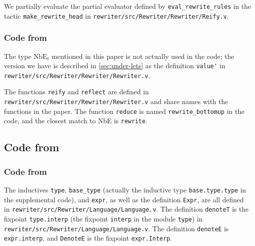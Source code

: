 \begin{subappendices}
We partially evaluate the partial evaluator defined by \verb|eval_rewrite_rules| in the tactic \verb|make_rewrite_head| in \texttt{rewriter/src/Rewriter/Rewriter/Reify.v}.

\subsubsection{Code from }

The type $\text{NbE}_t$ mentioned in this paper is not actually used in the code; the version we have is described in \autoref{sec:under-lets} as the definition \verb|value'| in \texttt{rewriter/src/Rewriter/Rewriter/Rewriter.v}.

The functions \verb|reify| and \verb|reflect| are defined in \texttt{rewriter/src/Rewriter/Rewriter/Rewriter.v} and share names with the functions in the paper.
The function \texttt{reduce} is named \verb|rewrite_bottomup| in the code, and the closest match to NbE is \verb|rewrite|.

\subsection{Code from }

\subsubsection{Code from }

The inductives \verb|type|, \verb|base_type| (actually the inductive type \verb|base.type.type| in the supplemental code), and \verb|expr|, as well as the definition \verb|Expr|, are all defined in \texttt{rewriter/src/Rewriter/Language/Language.v}.
The definition \verb|denoteT| is the fixpoint \verb|type.interp| (the fixpoint \verb|interp| in the module \verb|type|) in \texttt{rewriter/src/Rewriter/Language/Language.v}.
The definition \verb|denoteE| is \verb|expr.interp|, and \verb|DenoteE| is the fixpoint \verb|expr.Interp|.


\end{subappendices}
